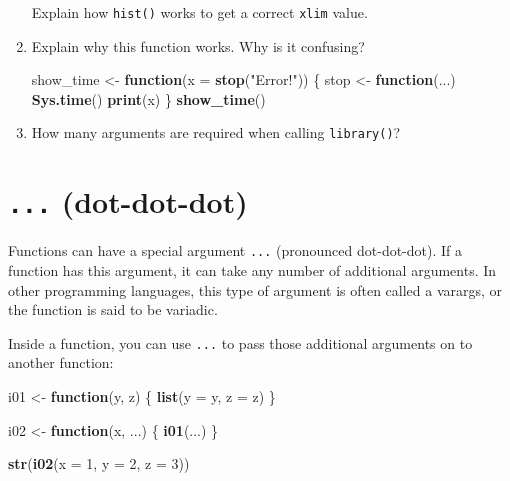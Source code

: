 \documentclass[]{book}
\newenvironment{Shaded}{\begin{snugshade}}{\end{snugshade}}
\newcommand{\ControlFlowTok}[1]{\textcolor[rgb]{0.13,0.29,0.53}{\textbf{#1}}}
\newcommand{\DataTypeTok}[1]{\textcolor[rgb]{0.13,0.29,0.53}{#1}}
\newcommand{\DecValTok}[1]{\textcolor[rgb]{0.00,0.00,0.81}{#1}}
\newcommand{\KeywordTok}[1]{\textcolor[rgb]{0.13,0.29,0.53}{\textbf{#1}}}
\newcommand{\NormalTok}[1]{#1}
\newcommand{\StringTok}[1]{\textcolor[rgb]{0.31,0.60,0.02}{#1}}
\theoremstyle{definition}
\theoremstyle{definition}
\theoremstyle{definition}
\theoremstyle{remark}
\begin{document}
\begin{enumerate}
  Explain how \texttt{hist()} works to get a correct \texttt{xlim}
  value.
\item
  Explain why this function works. Why is it confusing?

\begin{Shaded}
\begin{Highlighting}[]
\NormalTok{show_time <-}\StringTok{ }\ControlFlowTok{function}\NormalTok{(}\DataTypeTok{x =} \KeywordTok{stop}\NormalTok{(}\StringTok{"Error!"}\NormalTok{)) \{}
\NormalTok{  stop <-}\StringTok{ }\ControlFlowTok{function}\NormalTok{(...) }\KeywordTok{Sys.time}\NormalTok{()}
  \KeywordTok{print}\NormalTok{(x)}
\NormalTok{\}}
\KeywordTok{show_time}\NormalTok{()}
\end{Highlighting}
\end{Shaded}
\item
  How many arguments are required when calling \texttt{library()}?
\end{enumerate}

\hypertarget{fun-dot-dot-dot}{%
\section{\texorpdfstring{\texttt{...}
(dot-dot-dot)}{... (dot-dot-dot)}}\label{fun-dot-dot-dot}}

Functions can have a special argument \texttt{...} (pronounced
dot-dot-dot). If a function has this argument, it can take any number of
additional arguments. In other programming languages, this type of
argument is often called a varargs, or the function is said to be
variadic.

Inside a function, you can use \texttt{...} to pass those additional
arguments on to another function:

\begin{Shaded}
\begin{Highlighting}[]
\NormalTok{i01 <-}\StringTok{ }\ControlFlowTok{function}\NormalTok{(y, z) \{}
  \KeywordTok{list}\NormalTok{(}\DataTypeTok{y =}\NormalTok{ y, }\DataTypeTok{z =}\NormalTok{ z)}
\NormalTok{\}}

\NormalTok{i02 <-}\StringTok{ }\ControlFlowTok{function}\NormalTok{(x, ...) \{}
  \KeywordTok{i01}\NormalTok{(...)}
\NormalTok{\}}

\KeywordTok{str}\NormalTok{(}\KeywordTok{i02}\NormalTok{(}\DataTypeTok{x =} \DecValTok{1}\NormalTok{, }\DataTypeTok{y =} \DecValTok{2}\NormalTok{, }\DataTypeTok{z =} \DecValTok{3}\NormalTok{))}
\end{Highlighting}
\end{Shaded}
\end{document}
